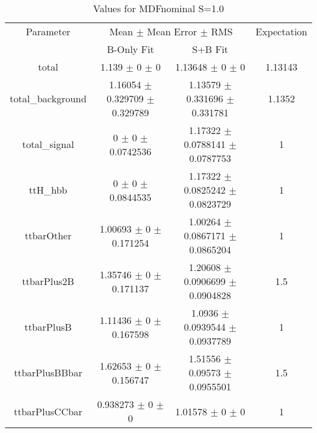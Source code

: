 \begin{table}
\centering
\caption{Values for MDFnominal S=1.0}
\begin{tabular}{cccc}
\toprule
Parameter & \multicolumn{2}{c}{Mean $\pm$ Mean Error $\pm$ RMS} & Expectation\\
 & B-Only Fit & S+B Fit & \\
\midrule
total & \num{1.139} $\pm$ \num{0} $\pm$ \num{0} & \num{1.13648} $\pm$ \num{0} $\pm$ \num{0} & \num{1.13143}\\
total\_background & \num{1.16054} $\pm$ \num{0.329709} $\pm$ \num{0.329789} & \num{1.13579} $\pm$ \num{0.331696} $\pm$ \num{0.331781} & \num{1.1352}\\
total\_signal & \num{0} $\pm$ \num{0} $\pm$ \num{0.0742536} & \num{1.17322} $\pm$ \num{0.0788141} $\pm$ \num{0.0787753} & \num{1}\\
ttH\_hbb & \num{0} $\pm$ \num{0} $\pm$ \num{0.0844535} & \num{1.17322} $\pm$ \num{0.0825242} $\pm$ \num{0.0823729} & \num{1}\\
ttbarOther & \num{1.00693} $\pm$ \num{0} $\pm$ \num{0.171254} & \num{1.00264} $\pm$ \num{0.0867171} $\pm$ \num{0.0865204} & \num{1}\\
ttbarPlus2B & \num{1.35746} $\pm$ \num{0} $\pm$ \num{0.171137} & \num{1.20608} $\pm$ \num{0.0906699} $\pm$ \num{0.0904828} & \num{1.5}\\
ttbarPlusB & \num{1.11436} $\pm$ \num{0} $\pm$ \num{0.167598} & \num{1.0936} $\pm$ \num{0.0939544} $\pm$ \num{0.0937789} & \num{1}\\
ttbarPlusBBbar & \num{1.62653} $\pm$ \num{0} $\pm$ \num{0.156747} & \num{1.51556} $\pm$ \num{0.09573} $\pm$ \num{0.0955501} & \num{1.5}\\
ttbarPlusCCbar & \num{0.938273} $\pm$ \num{0} $\pm$ \num{0} & \num{1.01578} $\pm$ \num{0} $\pm$ \num{0} & \num{1}\\
\bottomrule
\end{tabular}
\end{table}